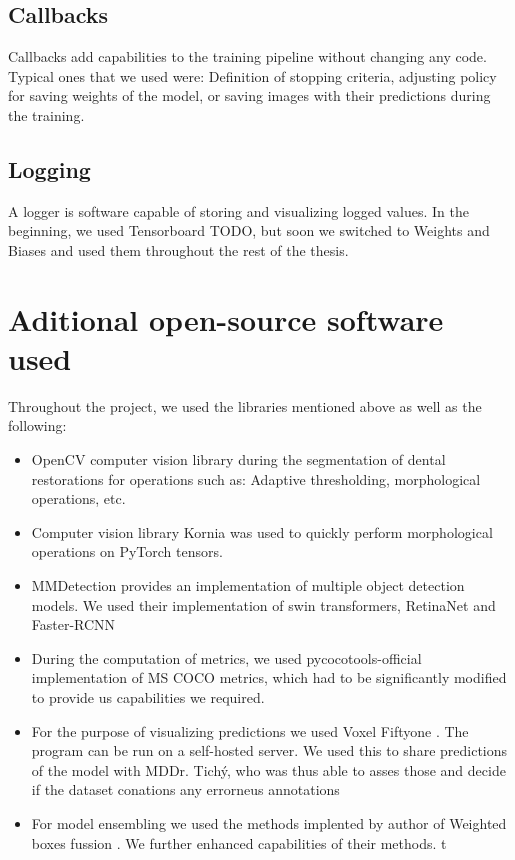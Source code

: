\subsection{Callbacks}
Callbacks add capabilities to the training pipeline without changing any code. Typical ones that we used were: Definition of stopping criteria, adjusting policy for saving weights of the model, or saving images with their predictions during the training.

\subsection{Logging}
A logger is software capable of storing and visualizing logged values. In the beginning, we used Tensorboard TODO, but soon we switched to Weights and Biases \cite{wandb} and used them throughout the rest of the thesis.

\section{Aditional open-source software used}
Throughout the project, we used the libraries mentioned above as well as the following:
\begin{itemize}
    \item OpenCV \cite{opencv_library}  computer vision library during the segmentation of dental restorations for operations such as: Adaptive thresholding, morphological operations, etc.
    \item Computer vision library Kornia \cite{eriba2019kornia} was used to quickly perform morphological operations on PyTorch tensors.
    \item MMDetection \cite{mmdetection} provides an implementation of multiple object detection models. We used their implementation of swin transformers, RetinaNet and Faster-RCNN
    \item During the computation of metrics, we used pycocotools-official \cite{pycocotools} implementation of MS COCO metrics, which had to be significantly modified to provide us capabilities we required.
    \item For the purpose of visualizing predictions we used Voxel Fiftyone \cite{moorefiftyone}. The program can be run on a self-hosted server. We used this to share predictions of the model with MDDr. Tichý, who was thus able to asses those and decide if the dataset conations any errorneus annotations
    \item For model ensembling we used the methods implented by author of Weighted boxes fussion \cite{Solovyev2019}. We further enhanced capabilities of their methods.
t\end{itemize}